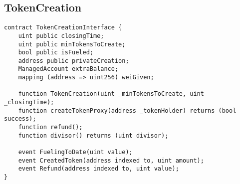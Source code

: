 \documentclass[9pt,oneside]{amsart}
\begin{document}
\subsection{TokenCreation}
\begin{verbatim}
contract TokenCreationInterface {
    uint public closingTime;   
    uint public minTokensToCreate;
    bool public isFueled;
    address public privateCreation;
    ManagedAccount extraBalance;
    mapping (address => uint256) weiGiven;

    function TokenCreation(uint _minTokensToCreate, uint _closingTime);
    function createTokenProxy(address _tokenHolder) returns (bool success);
    function refund();
    function divisor() returns (uint divisor);

    event FuelingToDate(uint value);
    event CreatedToken(address indexed to, uint amount);
    event Refund(address indexed to, uint value);
}
\end{verbatim}
\end{document}
